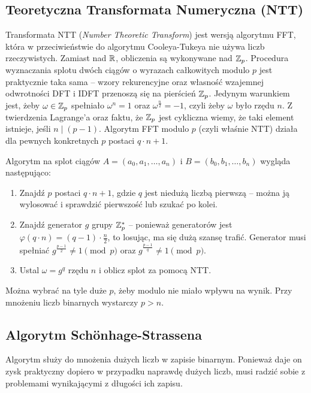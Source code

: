 \subsection{Teoretyczna Transformata Numeryczna (NTT)}
Transformata NTT (\textit{Number Theoretic Transform}) jest wersją algorytmu FFT, która w przeciwieństwie do algorytmu Cooleya-Tukeya nie używa liczb rzeczywistych. Zamiast nad \( \mathbb{R} \), obliczenia są wykonywane nad \( \mathbb{Z}_p \).
Procedura wyznaczania splotu dwóch ciągów o wyrazach całkowitych modulo \( p \) jest praktycznie taka sama -- wzory rekurencyjne oraz własność wzajemnej odwrotności DFT i IDFT przenoszą się na pierścień \( \mathbb{Z}_p \). Jedynym warunkiem jest, żeby \( \omega \in \mathbb{Z}_p \) spełniało \( \omega^n = 1 \) oraz  \( \omega^{\frac{n}{2}} = -1 \), czyli żeby \( \omega \) było rzędu \( n \).
Z twierdzenia Lagrange'a oraz faktu, że \( \mathbb{Z}_p \) jest cykliczna wiemy, że taki element istnieje, jeśli \( n \mid (p - 1) \). Algorytm FFT modulo \( p \) (czyli właśnie NTT) działa dla pewnych konkretnych \( p \) postaci \( q \cdot n + 1 \).

Algorytm na splot ciągów \( A = (a_0, a_1, \ldots, a_n) \) i \( B = (b_0, b_1, \ldots, b_n) \) wygląda następująco:
\begin{greyframe}
    \begin{enumerate}
        \item Znajdź \( p \) postaci \( q \cdot n + 1 \), gdzie \( q \) jest niedużą liczbą pierwszą -- można ją wylosować i sprawdzić pierwszość lub szukać po kolei.
        \item Znajdź generator \( g \) grupy \( \mathbb{Z}^{*}_p \) -- ponieważ generatorów jest \( \varphi(q \cdot n) = (q - 1) \cdot \frac{n}{2} \), to losując, ma się dużą szansę trafić.
        Generator musi spełniać \( g^{\frac{p-1}{2}} \neq 1 \pmod{p} \) oraz \( g^{\frac{p-1}{q}} \neq 1 \pmod{p} \).
        \item Ustal \( \omega = g^q \) rzędu \( n \) i oblicz splot za pomocą NTT.
    \end{enumerate}
\end{greyframe}
Można wybrać na tyle duże \( p \), żeby modulo nie miało wpływu na wynik. Przy mnożeniu liczb binarnych wystarczy \( p > n \).

\subsection{Algorytm Sch{\"o}nhage-Strassena}
Algorytm służy do mnożenia dużych liczb w zapisie binarnym. Ponieważ daje on zysk praktyczny dopiero w przypadku naprawdę dużych liczb, musi radzić sobie z problemami wynikającymi z długości ich zapisu.

